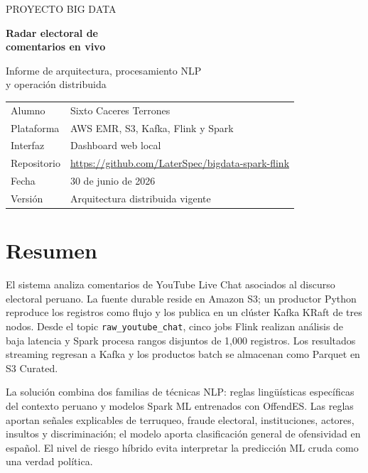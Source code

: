 \documentclass[11pt,a4paper,openany]{report}
\newcommand{\topic}[1]{\texttt{#1}}
\begin{document}
\begin{titlepage}
  \color{ink}
  \vspace*{2.2cm}
  {\Large\textcolor{gold!80!black}{PROYECTO BIG DATA}\par}
  \vspace{0.6cm}
  {\Huge\bfseries Radar electoral de\\[0.2cm]comentarios en vivo\par}
  \vspace{0.7cm}
  {\LARGE Informe de arquitectura, procesamiento NLP\\[0.15cm]y operación distribuida\par}
  \vfill
  \begin{tabular}{@{}ll@{}}
    Alumno & Sixto Caceres Terrones\\
    Plataforma & AWS EMR, S3, Kafka, Flink y Spark\\
    Interfaz & Dashboard web local\\
    Repositorio & \url{https://github.com/LaterSpec/bigdata-spark-flink}\\
    Fecha & 30 de junio de 2026\\
    Versión & Arquitectura distribuida vigente
  \end{tabular}
  \vspace{1.2cm}
\end{titlepage}
\color{ink}

\tableofcontents
\clearpage

\chapter*{Resumen}

El sistema analiza comentarios de YouTube Live Chat asociados al discurso electoral peruano. La fuente durable reside en Amazon S3; un productor Python reproduce los registros como flujo y los publica en un clúster Kafka KRaft de tres nodos. Desde el topic \topic{raw\_youtube\_chat}, cinco jobs Flink realizan análisis de baja latencia y Spark procesa rangos disjuntos de 1,000 registros. Los resultados streaming regresan a Kafka y los productos batch se almacenan como Parquet en S3 Curated.

La solución combina dos familias de técnicas NLP: reglas lingüísticas específicas del contexto peruano y modelos Spark ML entrenados con OffendES. Las reglas aportan señales explicables de terruqueo, fraude electoral, instituciones, actores, insultos y discriminación; el modelo aporta clasificación general de ofensividad en español. El nivel de riesgo híbrido evita interpretar la predicción ML cruda como una verdad política.
\end{document}
